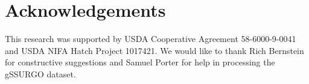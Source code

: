 \documentclass[letterpaper]{article} %
\begin{document}
\begin{abstract}
\end{abstract}



% 









\section{Acknowledgements}

This research was supported by USDA Cooperative Agreement 58-6000-9-0041 and USDA NIFA Hatch Project 1017421. We would like to thank Rich Bernstein for constructive suggestions and Samuel Porter for help in processing the gSSURGO dataset.
\end{document}
